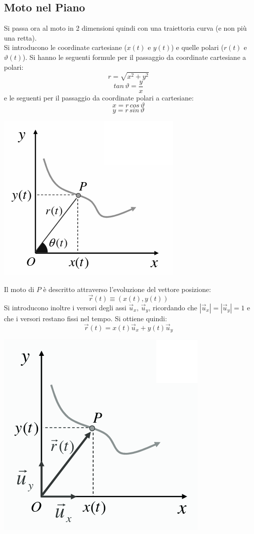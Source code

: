 \documentclass[a4paper,12pt, oneside]{book}
\begin{document}
\subsection{Moto nel Piano}
Si passa ora al moto in 2 dimensioni quindi con una traiettoria curva (e non più una retta).\\
Si introducono le coordinate cartesiane (${x}(t)$ e $y(t)$) e quelle polari ($r(t)$ e $\vartheta(t)$). Si hanno le seguenti formule per il passaggio da coordinate cartesiane a polari:
$$r=\sqrt{x^2+y^2}$$
$$tan\,\vartheta=\frac{y}{x}$$
e le seguenti per il passaggio da coordinate polari a cartesiane:
$$x=r\,cos\,\vartheta$$
$$y=r\,sin\,\vartheta$$
\begin{center}
\includegraphics[scale=0.4]{img/pia.png}
\end{center}
Il moto di $P$ è descritto attraverso l'evoluzione del vettore posizione:
$$\vec{r}(t)\equiv (x(t),y(t))$$
Si introducono inoltre i versori degli assi $\vec{u}_x,\,\vec{u}_y$, ricordando che $|\vec{u}_x|=|\vec{u}_y|=1$ e che i versori restano fissi nel tempo. Si ottiene quindi:
$$\vec{r}(t)=x(t)\vec{u}_x+y(t)\vec{u}_y$$
\begin{center}
\includegraphics[scale=0.4]{img/pia2.png}
\end{center}
\end{document}
